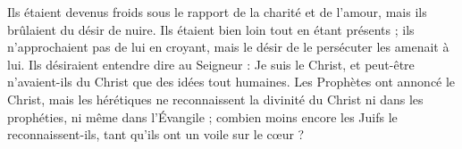  Ils étaient devenus froids sous le rapport de la charité et de l’amour, mais ils brûlaient du désir de nuire. Ils étaient bien loin tout en étant présents ; ils n’approchaient pas de lui en croyant, mais le désir de le persécuter les amenait à lui. Ils désiraient entendre dire au Seigneur : Je suis le Christ, et peut-être n’avaient-ils du Christ que des idées tout humaines. Les Prophètes ont annoncé le Christ, mais les hérétiques ne reconnaissent la divinité du Christ ni dans les prophéties, ni même dans l’Évangile ; combien moins encore les Juifs le reconnaissent-ils, tant qu’ils ont un voile sur le cœur ?